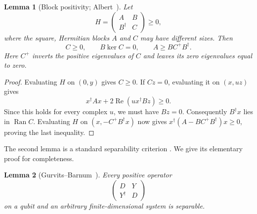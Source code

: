 \documentclass[aps,prl,reprint,superscriptaddress,longbibliography,raggedbottom]{revtex4-2}
\newtheorem{lemma}{Lemma}
\newcommand{\Ran}{\operatorname{Ran}}
\begin{document}
\begin{lemma}[{Block positivity; Albert~\cite[Theorem~1]{Albert69}}]\label{lem:schur}
Let
\[
H=\begin{pmatrix}A&B\\B^\dagger&C\end{pmatrix}\ge0,
\]
where the square, Hermitian blocks $A$ and $C$ may have different sizes. Then
\begin{equation}\label{eq:schur}
C\ge0,\qquad B\ker C=0,\qquad A\ge BC^+B^\dagger.
\end{equation}
Here $C^+$ inverts the positive eigenvalues of $C$ and leaves its zero
eigenvalues equal to zero.
\end{lemma}

\begin{proof}
Evaluating $H$ on $(0,y)$ gives $C\ge0$. If $Cz=0$, evaluating it
on $(x,uz)$ gives
\[
x^\dagger Ax+2\operatorname{Re}(u x^\dagger Bz)\ge0.
\]
Since this holds for every complex $u$, we must have $Bz=0$.
Consequently $B^\dagger x$ lies in $\Ran C$. Evaluating $H$ on
$(x,-C^+B^\dagger x)$ now gives
$x^\dagger(A-BC^+B^\dagger)x\ge0$, proving the last inequality.
\end{proof}


The second lemma is a standard separability criterion
\cite[Proposition 1]{GB02}. We give its elementary proof for completeness.

\begin{lemma}[{Gurvits--Barnum~\cite{GB02}}]\label{lem:equal}
Every positive operator
\begin{equation}\label{eq:equal}
\begin{pmatrix}D&Y\\Y^\dagger&D\end{pmatrix}
\end{equation}
on a qubit and an arbitrary finite-dimensional system is separable.
\end{lemma}
\end{document}
